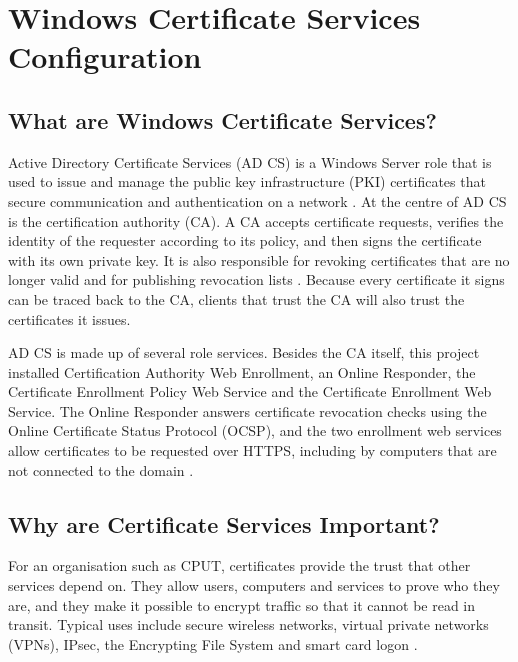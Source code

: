 \chapter{Windows Certificate Services Configuration}
\label{chap:certs}

\section{What are Windows Certificate Services?}
\label{sec:certs-what}
Active Directory Certificate Services (AD CS) is a Windows Server role that is used to issue and manage the public key infrastructure (PKI) certificates that secure communication and authentication on a network \cite{certs-overview}. At the centre of AD CS is the certification authority (CA). A CA accepts certificate requests, verifies the identity of the requester according to its policy, and then signs the certificate with its own private key. It is also responsible for revoking certificates that are no longer valid and for publishing revocation lists \cite{certs-cc731523}. Because every certificate it signs can be traced back to the CA, clients that trust the CA will also trust the certificates it issues.

AD CS is made up of several role services. Besides the CA itself, this project installed Certification Authority Web Enrollment, an Online Responder, the Certificate Enrollment Policy Web Service and the Certificate Enrollment Web Service. The Online Responder answers certificate revocation checks using the Online Certificate Status Protocol (OCSP), and the two enrollment web services allow certificates to be requested over HTTPS, including by computers that are not connected to the domain \cite{certs-cc731523,certs-overview}.

\section{Why are Certificate Services Important?}
\label{sec:certs-why}
For an organisation such as CPUT, certificates provide the trust that other services depend on. They allow users, computers and services to prove who they are, and they make it possible to encrypt traffic so that it cannot be read in transit. Typical uses include secure wireless networks, virtual private networks (VPNs), IPsec, the Encrypting File System and smart card logon \cite{certs-cc731523}.

